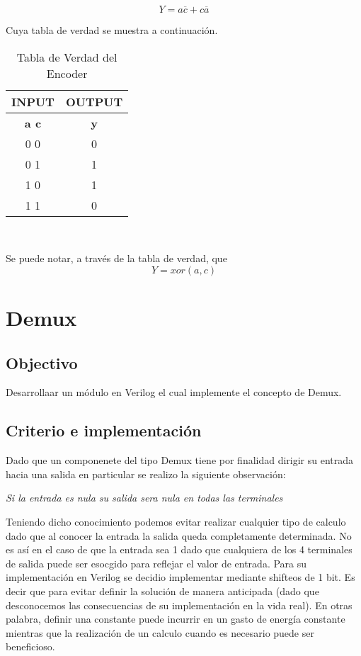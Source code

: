 \begin{center}
$$Y = a\overline{c} + c\overline{a}$$
\end{center}
Cuya tabla de verdad se muestra a continuaci\'on.
\begin{center}
	\begin{table}[h!]
		\begin{center}
			\caption{Tabla de Verdad del Encoder}
			\begin{tabular}{|c|c|}
				\hline
				\textbf{INPUT} & \textbf{OUTPUT} \\
				\hline
				\textbf{a c} & \textbf{y} \\
				\hline
				0 0 & 0\\
				\hline
				0 1 & 1 \\
				\hline
				1 0 & 1\\
				\hline
				1 1 & 0\\
				\hline
			\end{tabular} \\
		\end{center}
	\end{table}
\end{center}
Se puede notar, a trav\'es de la tabla de verdad, que $$Y = xor(a,c)$$
\section{Demux}
\subsection{Objectivo}
Desarrollaar un módulo en Verilog el cual implemente el concepto de Demux.

\subsection{Criterio e implementación}
Dado que un componenete del tipo Demux tiene por finalidad dirigir su entrada hacia una salida en particular se realizo la siguiente observación:
\begin{center}
\textit{Si la entrada es nula su salida sera nula en todas las terminales}
\end{center}
Teniendo dicho conocimiento podemos evitar realizar cualquier tipo de calculo dado que al conocer la entrada la salida queda completamente determinada.
No es así en el caso de que la entrada sea 1 dado que cualquiera de los 4 terminales de salida puede ser esocgido para reflejar el valor de entrada.
Para su implementación en Verilog se decidio implementar mediante shifteos de 1 bit. Es decir que para evitar definir la solución de manera anticipada (dado que desconocemos las consecuencias de su implementación en la vida real). En otras palabra, definir una constante puede incurrir en un gasto de energía constante mientras que la realización de un calculo cuando es necesario puede ser beneficioso.


